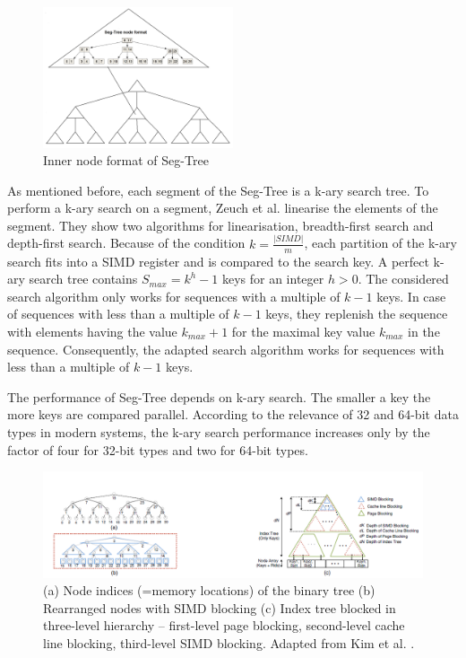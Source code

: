 \documentclass[conference]{IEEEtran}
\begin{document}
\begin{figure}
	\includegraphics[width=0.5\textwidth]{figure_2.png}
	\caption{Inner node format of Seg-Tree}
	\label{fig}
\end{figure}

As mentioned before, each segment of the Seg-Tree is a k-ary search tree. To perform a k-ary search on a segment, Zeuch et al. linearise the elements of the segment. They show two algorithms for linearisation, breadth-first search and depth-first search. Because of the condition $k = \frac{\vert SIMD \vert }{m}$, each partition of the k-ary search fits into a SIMD register and is compared to the search key. A perfect k-ary search tree contains  $S_{max} = k^h - 1$ keys for an integer $h > 0$. The considered search algorithm only works for sequences with a multiple of $k-1$ keys. In case of  sequences with less than a multiple of $k-1$ keys, they replenish the sequence with elements having the value $k_{max} + 1$ for the maximal key value $k_{max}$ in the sequence. Consequently, the adapted search algorithm works for sequences with less than a multiple of $k-1$ keys.

The performance of Seg-Tree depends on k-ary search. The smaller a key the more keys are compared parallel. According to the relevance of 32 and 64-bit data types in modern systems, the k-ary search performance increases only by the factor of four for 32-bit types and two for 64-bit types.

\begin{figure}
	\includegraphics[width=1.0\textwidth]{figure_3.png}
	\caption{(a) Node indices (=memory locations) of the binary tree (b) Rearranged nodes with SIMD blocking (c) Index tree blocked in three-level
		hierarchy – first-level page blocking, second-level cache line blocking, third-level SIMD blocking. Adapted from Kim et al. \cite{b6}.}
	\label{fig}
\end{figure}
\end{document}
